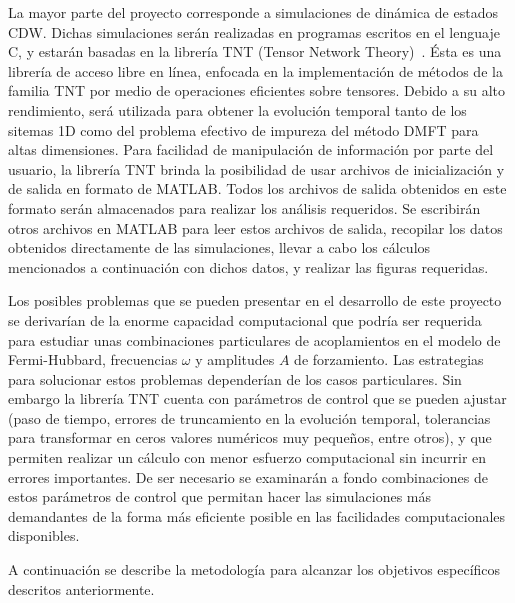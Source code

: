 \documentclass[a4paper,10pt]{article}
\begin{document}
La mayor parte del proyecto corresponde a simulaciones de din\'amica de estados CDW. Dichas simulaciones ser\'an realizadas en programas escritos en el lenguaje C, y estar\'an basadas en la librer\'ia TNT (Tensor Network Theory)~\cite{tnt}. \'Esta es una librer\'ia de acceso libre en l\'inea, enfocada en la implementaci\'on de m\'etodos de la familia TNT por medio de operaciones eficientes sobre tensores. Debido a su alto rendimiento, ser\'a utilizada para obtener la evoluci\'on temporal tanto de los sitemas 1D como del problema efectivo de impureza del m\'etodo DMFT para altas dimensiones. Para facilidad de manipulaci\'on de informaci\'on por parte del usuario, la librer\'ia TNT brinda la posibilidad de usar archivos de inicializaci\'on y de salida en formato de MATLAB. Todos los archivos de salida obtenidos en este formato ser\'an almacenados para realizar los an\'alisis requeridos. Se escribir\'an otros archivos en MATLAB para leer estos archivos de salida, recopilar los datos obtenidos directamente de las simulaciones, llevar a cabo los c\'alculos mencionados a continuaci\'on con dichos datos, y realizar las figuras requeridas.     

Los posibles problemas que se pueden presentar en el desarrollo de este proyecto se derivar\'ian de la enorme capacidad computacional que podr\'ia ser requerida para estudiar unas combinaciones particulares de acoplamientos en el modelo de Fermi-Hubbard, frecuencias $\omega$ y amplitudes $A$ de forzamiento. Las estrategias para solucionar estos problemas depender\'ian de los casos particulares. Sin embargo la librer\'ia TNT cuenta con par\'ametros de control que se pueden ajustar (paso de tiempo, errores de truncamiento en la evoluci\'on temporal, tolerancias para transformar en ceros valores num\'ericos muy peque\~nos, entre otros), y que permiten realizar un c\'alculo con menor esfuerzo computacional sin incurrir en errores importantes. De ser necesario se examinar\'an a fondo combinaciones de estos par\'ametros de control que permitan hacer las simulaciones m\'as demandantes de la forma m\'as eficiente posible en las facilidades computacionales disponibles. 

A continuaci\'on se describe la metodolog\'ia para alcanzar los objetivos espec\'ificos descritos anteriormente.
\end{document}
